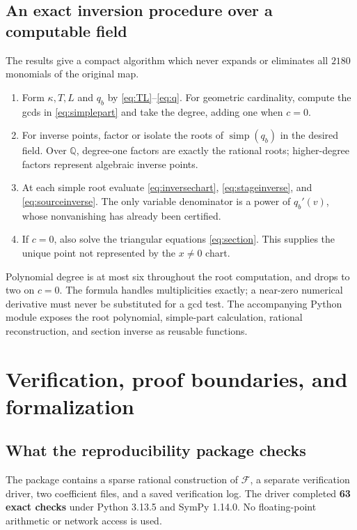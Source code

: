 \documentclass[11pt,a4paper]{article}
\theoremstyle{definition}
\newcommand{\Q}{\mathbb Q}
\newcommand{\simp}{\operatorname{simp}}
\newcommand{\F}{\mathcal F}
\newcommand{\kk}{\kappa}
\begin{document}
\subsection{An exact inversion procedure over a computable field}
The results give a compact algorithm which never expands or eliminates
all $2180$ monomials of the original map.
\begin{enumerate}[label=\textbf{Step \arabic*.}]
\item Form $\kk,T,L$ and $q_b$ by \eqref{eq:TL}--\eqref{eq:q}. For geometric
cardinality, compute the gcds in \eqref{eq:simplepart} and take the degree,
adding one when $c=0$.
\item For inverse points, factor or isolate the roots of $\simp(q_b)$ in
the desired field. Over $\Q$, degree-one factors are exactly the rational
roots; higher-degree factors represent algebraic inverse points.
\item At each simple root evaluate \eqref{eq:inversechart},
\eqref{eq:stageinverse}, and \eqref{eq:sourceinverse}. The only variable
denominator is a power of $q_b'(v)$, whose nonvanishing has already been
certified.
\item If $c=0$, also solve the triangular equations \eqref{eq:section}.
This supplies the unique point not represented by the $x\ne0$ chart.
\end{enumerate}
Polynomial degree is at most six throughout the root computation, and
drops to two on $c=0$. The formula handles multiplicities exactly; a
near-zero numerical derivative must never be substituted for a gcd test.
The accompanying Python module exposes the root polynomial, simple-part
calculation, rational reconstruction, and section inverse as reusable
functions.

\section{Verification, proof boundaries, and formalization}
\label{sec:verification}

\subsection{What the reproducibility package checks}
The package contains a sparse rational construction of $\F$, a separate
verification driver, two coefficient files, and a saved verification log.
The driver completed \textbf{63 exact checks} under Python 3.13.5 and
SymPy 1.14.0. No floating-point arithmetic or network access is used.
\end{document}
